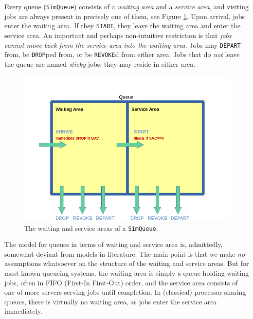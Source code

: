\documentclass[12pt]{book}
\begin{document}
Every queue (\lstinline|SimQueue|) consists of
  a {\em waiting area\/} and a {\em service area},
  and visiting jobs are always present in precisely
  one of them,
  see Figure \ref{fig:WaitingAndServiceArea}.
Upon arrival, jobs enter the waiting area.
If they \lstinline|START|,
  they leave the waiting area and
  enter the service area.
An important and perhaps non-intuitive restriction
  is that {\em jobs cannot move back from the service area
  into the waiting area}.
Jobs may \lstinline|DEPART| from,
  be \lstinline|DROP|ped from,
  or be \lstinline|REVOKE|d from
  either area.
Jobs that do {\em not\/} leave the queue
  are named {\em sticky\/} jobs;
  they may reside in either area.

\begin{figure}[h]
\label{fig:WaitingAndServiceArea}
\caption{The waiting and service areas of a \texttt{SimQueue}.}
\includegraphics[width=\textwidth]{WaitingAndServiceArea}
\end{figure}

The model for queues in terms of waiting and service area is,
  admittedly, somewhat deviant from models in literature.
The main point is that we make {\em no\/} assumptions
  whatsoever on the structure of the waiting and service areas.
But for most known queueing systems,
  the waiting area is simply a queue holding waiting jobs,
  often in FIFO (First-In First-Out) order,
  and the service area consists of one of more servers
  serving jobs until completion.
In (classical) processor-sharing queues,
  there is virtually no waiting area,
  as jobs enter the service area immediately.
\end{document}
